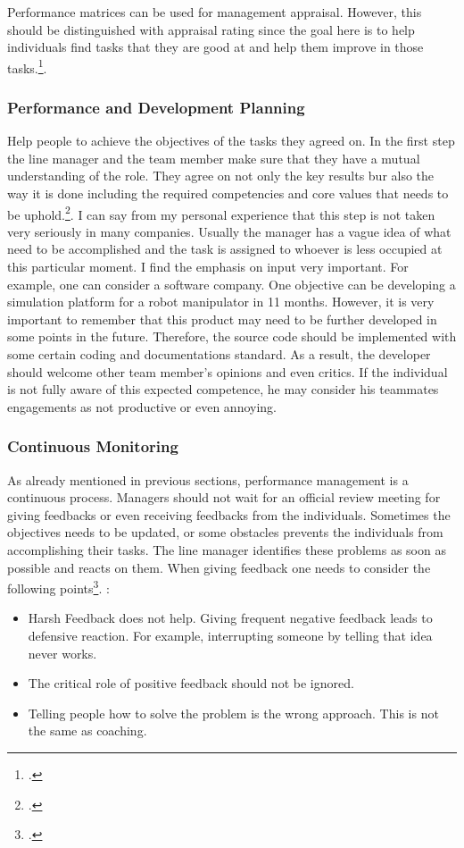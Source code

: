 Performance matrices can be used for management appraisal. However, this should be distinguished with appraisal rating since the goal here is to help individuals find tasks that they are good at and help them improve in those tasks.\footcite[See][]{Armstrong2006}. 

\subsubsection{Performance and Development Planning}
Help people to achieve the objectives of the tasks they agreed on. In the first step the line manager and the team member make sure that they have a mutual understanding of the role. They agree on not only the key results bur also the way it is done including the required competencies and core values that needs to be uphold.\footcite[See][]{Armstrong2006}. 
 I can say from my personal experience that this step is not taken very seriously in many companies. Usually the manager has a vague idea of what need to be accomplished and the task is assigned to whoever is less occupied at this particular moment.  I find the emphasis on input very important. For example, one can consider a software company. One objective can be developing a simulation platform for a robot manipulator in 11 months. However, it is very important to remember that this product may need to be further developed in some points in the future. Therefore, the source code should be implemented with some certain coding and documentations standard. As a result, the developer should welcome other team member's opinions and even critics. If the individual is not fully aware of this expected competence, he may consider his teammates engagements as not productive or even annoying. 
\subsubsection{Continuous Monitoring}

As already mentioned in previous sections, performance management is a continuous process. Managers should not wait for an official review meeting for giving feedbacks or even receiving feedbacks from the individuals. Sometimes the objectives needs to be updated, or some obstacles prevents the individuals from accomplishing their tasks. The line manager identifies these problems as soon as possible and reacts on them. When giving feedback one needs to consider the following points\footcite[See][]{Chappelow2019}. : 
\begin{itemize}
\item Harsh Feedback does not help. Giving frequent negative feedback leads to defensive reaction.  For example, interrupting someone by telling that idea never works.
\item The critical role of positive feedback should not be ignored.
\item Telling people how to solve the problem is the wrong approach.  This is not the same as coaching.
\end{itemize}

